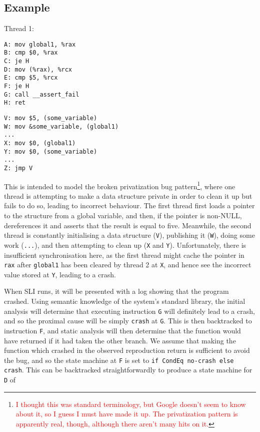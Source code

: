 \documentclass[10pt,twocolumn,preprint,natbib,authoryear]{sigplanconf}
\newcommand{\editorial}[1]{\textcolor{red}{\footnote{\textcolor{red}{#1}}}}
\begin{document}
\subsection{Example}
\label{sect:ex_privatise}

Thread 1:

\begin{verbatim}
A: mov global1, %rax
B: cmp $0, %rax
C: je H
D: mov (%rax), %rcx
E: cmp $5, %rcx
F: je H
G: call __assert_fail
H: ret
\end{verbatim}

\begin{verbatim}
V: mov $5, (some_variable)
W: mov &some_variable, (global1)
...
X: mov $0, (global1)
Y: mov $0, (some_variable)
...
Z: jmp V
\end{verbatim}

This is intended to model the broken privatization bug
pattern\editorial{I thought this was standard terminology, but Google
  doesn't seem to know about it, so I guess I must have made it
  up. The privatization pattern is apparently real, though, although
  there aren't many hits on it.}, where one thread is attempting to
make a data structure private in order to clean it up but fails to do
so, leading to incorrect behaviour.  The first thread first loads a
pointer to the structure from a global variable, and then, if the
pointer is non-NULL, dereferences it and asserts that the result is
equal to five.  Meanwhile, the second thread is constantly
initialising a data structure (\verb|V|), publishing it (\verb|W|),
doing some work (\verb|...|), and then attempting to clean up
(\verb|X| and \verb|Y|).  Unfortunately, there is insufficient
synchronisation here, as the first thread might cache the pointer in
\verb|rax| after \verb|global1| has been cleared by thread 2 at
\verb|X|, and hence see the incorrect value stored at \verb|Y|,
leading to a crash.

When SLI runs, it will be presented with a log showing that the
program crashed.  Using semantic knowledge of the system's standard
library, the initial analysis will determine that executing
instruction \verb|G| will definitely lead to a crash, and so the
proximal cause will be simply \verb|crash| at \verb|G|.  This is then
backtracked to instruction \verb|F|, and static analysis will then
determine that the function would have returned if it had taken the
other branch.  We assume that making the function which crashed in the
observed reproduction return is sufficient to avoid the bug, and so
the state machine at \verb|F| is set to
\verb|if CondEq no-crash else crash|.  This can be backtracked
straightforwardly to produce a state machine for \verb|D| of
\end{document}
